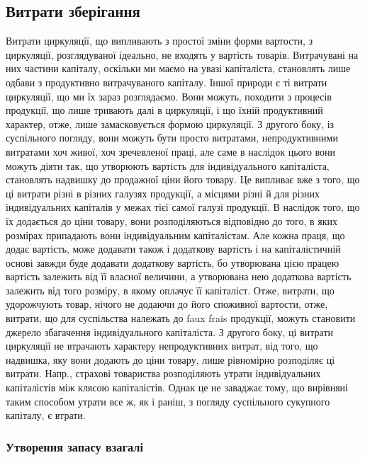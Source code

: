 \subsection{Витрати зберігання}

Витрати циркуляції, що випливають з простої зміни форми вартости,
з циркуляції, розглядуваної ідеально, не входять у вартість товарів.
Витрачувані на них частини капіталу, оскільки ми маємо на увазі капіталіста,
становлять лише одбави з продуктивно витрачуваного капіталу.
Іншої природи є ті витрати циркуляції, що ми їх зараз розглядаємо. Вони
можуть, походити з процесів продукції, що лише тривають далі в циркуляції,
і що їхній продуктивний характер, отже, лише замасковується формою
циркуляції. З другого боку, із суспільного погляду, вони можуть бути
просто витратами, непродуктивними витратами хоч живої, хоч зречевленої
праці, але саме в наслідок цього вони можуть діяти так, що утворюють
вартість для індивідуального капіталіста, становлять надвишку до продажної
ціни його товару. Це випливає вже з того, що ці витрати різні в різних галузях
продукції, а місцями різні й для різних індивідуальних капіталів у межах
тієї самої галузі продукції. В наслідок того, що їх додається до ціни
товару, вони розподіляються відповідно до того, в яких розмірах припадають
вони індивідуальним капіталістам. Але кожна праця, що додає
вартість, може додавати також і додаткову вартість і на капіталістичній
основі завжди буде додавати додаткову вартість, бо утворювана цією працею
вартість залежить від її власної величини, а утворювана нею додаткова
вартість залежить від того розміру, в якому оплачує її капіталіст.
Отже, витрати, що удорожчують товар, нічого не додаючи до його
споживної вартости, отже, витрати, що для суспільства належать до faux
frais продукції, можуть становити джерело збагачення індивідуального
капіталіста. З другого боку, ці витрати циркуляції не втрачають характеру
непродуктивних витрат, від того, що надвишка, яку вони додають до
ціни товару, лише рівномірно розподіляє ці витрати. Напр., страхові
товариства розподіляють утрати індивідуальних капіталістів між клясою
капіталістів. Однак це не заваджає тому, що вирівняні таким способом
утрати все ж, як і раніш, з погляду суспільного сукупного капіталу, є втрати.

\subsubsection{Утворення запасу взагалі}


